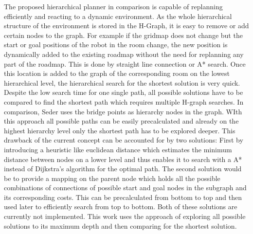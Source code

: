 The proposed hierarchical planner in comparison is capable of replanning efficiently and reacting to a dynamic environment. As the whole hierarchical structure of the environment is stored in the H-Graph, it is easy to remove or add certain nodes to the graph. For example if the gridmap does not change but the start or goal positions of the robot in the room change, the new position is dynamically added to the existing roadmap without the need for replanning any part of the roadmap. This is done by straight line connection or A* search. Once this location is added to the graph of the corresponding room on the lowest hierarchical level, the hierarchical search for the shortest solution is very quick. Despite the low search time for one single path, all possible solutions have to be compared to find the shortest path which requires multiple H-graph searches. In comparison, Seder \cite{seder_hierarchical_2011} uses the bridge points as hierarchy nodes in the graph. WIth this approach all possible paths can be easily precalculated and already on the highest hierarchy level only the shortest path has to be explored deeper. This drawback of the current concept can be accounted for by two solutions: First by introducing a heuristic like euclidean distance which estimates the minimum distance between nodes on a lower level and thus enables it to search with a A* instead of Dijkstra's algorithm for the optimal path. The second solution would be to provide a mapping on the parent node which holds all the possible combinations of connections of possible start and goal nodes in the subgraph and its corresponding costs. This can be precalculated from bottom to top and then used later to efficiently search from top to bottom. Both of these solutions are currently not implemented. This work uses the approach of exploring all possible solutions to its maximum depth and then comparing for the shortest solution.

